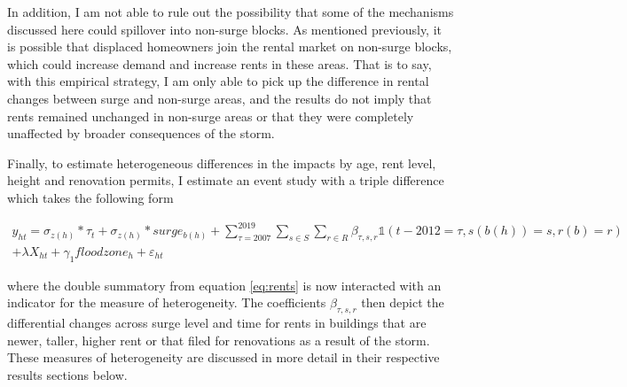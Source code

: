 \documentclass[12pt]{article}
\begin{document}
{{{{In addition, I am not able to rule out the possibility that some of the mechanisms discussed here could spillover into non-surge blocks.  As mentioned previously, it is possible that displaced homeowners join the rental market on non-surge blocks, which could increase demand and increase rents in these areas. That is to say, with this empirical strategy, I am only able to pick up the difference in rental changes between surge and non-surge areas, and the results do not imply that rents remained unchanged in non-surge areas or that they were completely unaffected by broader consequences of the storm. 

Finally, to estimate heterogeneous differences in the impacts by age, rent level, height and renovation permits, I estimate an event study with a triple difference which takes the following form

\begin{equation}
\label{eq:renov}
\begin{split}
y_{ht}= \sigma_{z(h)}\ast\tau_t+\sigma_{z(h)}\ast surge_{b(h)}  + \sum_{\tau=2007}^{2019}\sum_{s\in S}\sum_{r\in R}{\beta_{\tau,s,r}\mathbb{1}}(t-2012=\tau,s\left(b(h)\right)=s, r(b) = r) \\ + \lambda X_{ht}+\gamma_{1}floodzone_h+ \varepsilon_{ht}
\end{split}
\end{equation}


where the double summatory from equation \ref{eq:rents} is now interacted with an indicator for the measure of heterogeneity.  The coefficients $\beta_{\tau,s,r}$ then depict the differential changes across surge level and time for rents in buildings that are newer, taller, higher rent or that filed for renovations as a result of the storm. These measures of heterogeneity are discussed in more detail in their respective results sections below. 



}}}}
\end{document}
